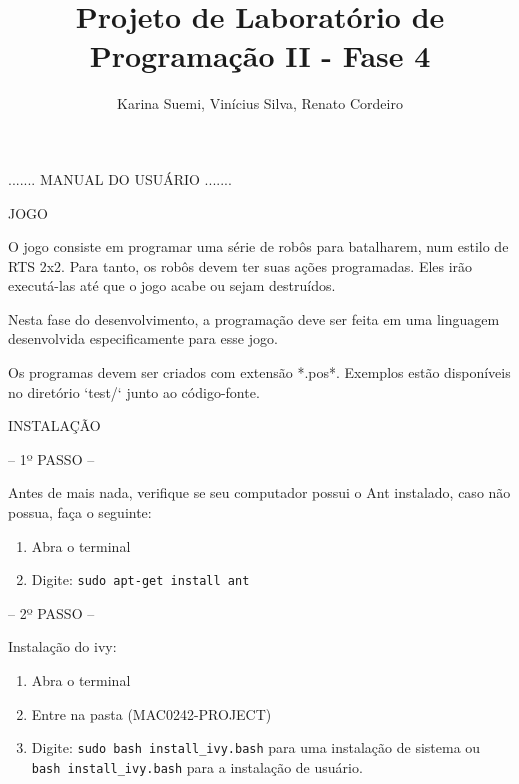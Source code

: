\documentclass[a4paper]{article}
\title  {Projeto de Laboratório de Programação II - Fase 4}
\author {Karina Suemi, Vinícius Silva, Renato Cordeiro}
\date   {}
\begin{document}
\maketitle

\bigskip
\bigskip
\bigskip
\bigskip

{\textcolor{NavyBlue}{\Huge{....... MANUAL DO USUÁRIO .......}}


\newpage

     
{\textcolor{NavyBlue}{\LARGE JOGO }

\bigskip

O  jogo consiste  em programar uma  série de 
robôs para batalharem, num estilo de RTS 2x2.
Para  tanto,  os robôs devem  ter suas ações 
programadas. Eles irão executá-las até que o 
jogo acabe ou sejam destruídos.

Nesta fase do desenvolvimento, a programação 
deve ser feita em uma linguagem desenvolvida
especificamente para esse jogo.

Os programas devem  ser criados com extensão 
*.pos*.   Exemplos   estão   disponíveis  no 
diretório `test/` junto ao código-fonte.

\bigskip
\bigskip
\bigskip
\bigskip

{\textcolor{NavyBlue}{\LARGE INSTALAÇÃO }
                
\bigskip
                                            
\textcolor{NavyBlue}{-- 1º PASSO --}

Antes de mais nada, verifique se seu computador possui
o Ant instalado, caso não possua, faça o seguinte:

\begin{enumerate}
    \item Abra o terminal

    \item Digite: \texttt{sudo apt-get install ant}
\end{enumerate}

\bigskip



\textcolor{NavyBlue}{-- 2º PASSO --}

Instalação do ivy:

\begin{enumerate}
    \item Abra o terminal

    \item Entre na pasta (MAC0242-PROJECT)

    \item Digite: \texttt{sudo bash install\_ivy.bash} para uma instalação
          de sistema ou \texttt{bash install\_ivy.bash} para a
          instalação de usuário.
    

\end{enumerate}}}}
\end{document}
